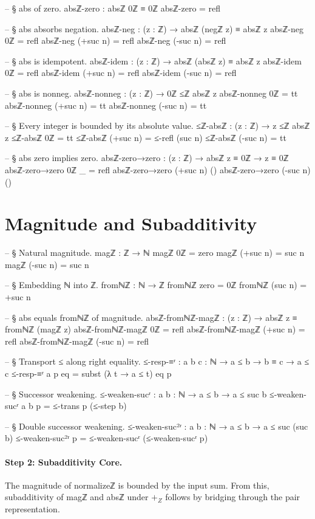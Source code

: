 \documentclass[11pt,a4paper]{book}
\def\mathbb#1{#1}%
\def\texttt#1{#1}%
\begin{document}
\begin{code}
-- § abs of zero.
absℤ-zero : absℤ 0ℤ ≡ 0ℤ
absℤ-zero = refl

-- § abs absorbs negation.
absℤ-neg : (z : ℤ) → absℤ (negℤ z) ≡ absℤ z
absℤ-neg 0ℤ = refl
absℤ-neg (+suc n) = refl
absℤ-neg (-suc n) = refl

-- § abs is idempotent.
absℤ-idem : (z : ℤ) → absℤ (absℤ z) ≡ absℤ z
absℤ-idem 0ℤ = refl
absℤ-idem (+suc n) = refl
absℤ-idem (-suc n) = refl

-- § abs is nonneg.
absℤ-nonneg : (z : ℤ) → 0ℤ ≤ℤ absℤ z
absℤ-nonneg 0ℤ = tt
absℤ-nonneg (+suc n) = tt
absℤ-nonneg (-suc n) = tt

-- § Every integer is bounded by its absolute value.
≤ℤ-absℤ : (z : ℤ) → z ≤ℤ absℤ z
≤ℤ-absℤ 0ℤ = tt
≤ℤ-absℤ (+suc n) = ≤-refl (suc n)
≤ℤ-absℤ (-suc n) = tt

-- § abs zero implies zero.
absℤ-zero→zero : (z : ℤ) → absℤ z ≡ 0ℤ → z ≡ 0ℤ
absℤ-zero→zero 0ℤ _ = refl
absℤ-zero→zero (+suc n) ()
absℤ-zero→zero (-suc n) ()
\end{code}

\section{Magnitude and Subadditivity}

\begin{code}
-- § Natural magnitude.
magℤ : ℤ → ℕ
magℤ 0ℤ = zero
magℤ (+suc n) = suc n
magℤ (-suc n) = suc n

-- § Embedding ℕ into ℤ.
fromℕℤ : ℕ → ℤ
fromℕℤ zero = 0ℤ
fromℕℤ (suc n) = +suc n

-- § abs equals fromℕℤ of magnitude.
absℤ-fromℕℤ-magℤ : (z : ℤ) → absℤ z ≡ fromℕℤ (magℤ z)
absℤ-fromℕℤ-magℤ 0ℤ = refl
absℤ-fromℕℤ-magℤ (+suc n) = refl
absℤ-fromℕℤ-magℤ (-suc n) = refl

-- § Transport ≤ along right equality.
≤-resp-≡ʳ : {a b c : ℕ} → a ≤ b → b ≡ c → a ≤ c
≤-resp-≡ʳ {a} p eq = subst (λ t → a ≤ t) eq p

-- § Successor weakening.
≤-weaken-sucʳ : {a b : ℕ} → a ≤ b → a ≤ suc b
≤-weaken-sucʳ {a} {b} p = ≤-trans p (≤-step b)

-- § Double successor weakening.
≤-weaken-suc²ʳ : {a b : ℕ} → a ≤ b → a ≤ suc (suc b)
≤-weaken-suc²ʳ p = ≤-weaken-sucʳ (≤-weaken-sucʳ p)
\end{code}

\paragraph{Step 2: Subadditivity Core.}
The magnitude of \texttt{normalizeℤ} is bounded by the input sum.
From this, subadditivity of \texttt{magℤ} and \texttt{absℤ} under $+_{\mathbb{Z}}$
follows by bridging through the pair representation.
\end{document}
